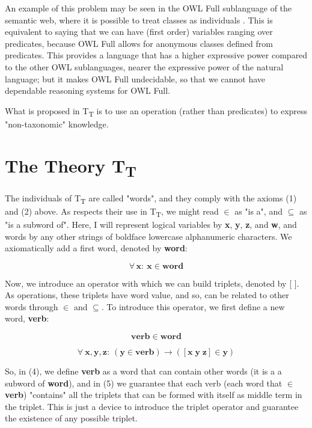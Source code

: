 \documentclass{IOS-Book-Article}     %
\begin{document}
An example of this problem may be seen in the OWL Full sublanguage of
the semantic web, where it is possible to treat classes as individuals \cite{9}.
This is equivalent to saying that we can have (first order)
variables ranging over predicates, because OWL Full
allows for anonymous classes defined from predicates. This provides a
language that has a higher expressive power compared to the other OWL
sublanguages, nearer the expressive power of the natural language;
but it makes OWL Full undecidable, so that we cannot have dependable
reasoning systems for OWL Full.

What is proposed in T\textsubscript{T} is to use an operation
(rather than predicates) to express "non-taxonomic" knowledge.

\section{The Theory T\textsubscript{T}}
The individuals of T\textsubscript{T} are called "words", and they comply with
the axioms (1) and (2) above. As respects their use in T\textsubscript{T},
we might read $\in$ as "is a", and $\subseteq$ as "is a subword of".
Here, I will represent logical variables
by \textbf{x}, \textbf{y}, \textbf{z}, and \textbf{w}, and words
by any other strings of boldface lowercase alphanumeric
characters. We axiomatically add a first word, denoted by \textbf{word}:

\begin{equation}
\forall\,\mathbf{x:\:x\in word}
\end{equation}

Now, we introduce an operator with which we can build triplets, denoted by [ ].
As operations, these triplets have word value, and so, can be related to
other words through $\in$ and $\subseteq$. To introduce this operator,
we first define a new word, \textbf{verb}:

\begin{equation}
\mathbf{verb\in word}
\end{equation}

\begin{equation}
\forall\:\mathbf{x\mathrm{,\mathbf{y\mathrm{,\mathbf{z}:\:\mathbf{\left(\mathbf{y\in\mathbf{verb}}\right)\rightarrow\left(\left[\mathbf{x\; y\; z}\right]\in y\right)}}}}}
\end{equation}

So, in (4), we define \textbf{verb} as a word that can contain other words
(it is a a subword of \textbf{word}), and in (5) we guarantee that each verb
(each word that $\in$ \textbf{verb}) "contains" all the triplets that can be
formed with itself as middle term in the triplet. This is just a device to
introduce the triplet operator and guarantee the existence of
any possible triplet.
\end{document}
